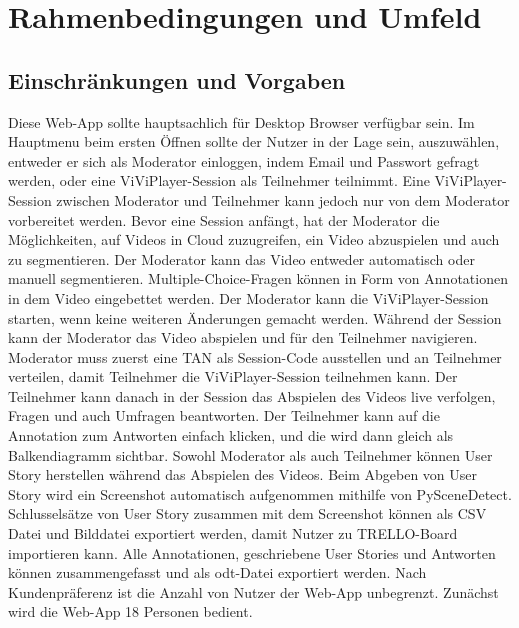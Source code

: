\section{Rahmenbedingungen und Umfeld}

\subsection{Einschränkungen und Vorgaben}
Diese Web-App sollte hauptsachlich für Desktop Browser verfügbar sein. Im Hauptmenu beim ersten Öffnen sollte der Nutzer in der Lage sein, auszuwählen, entweder er sich als Moderator einloggen, indem Email und Passwort gefragt werden, oder eine ViViPlayer-Session als Teilnehmer teilnimmt. Eine ViViPlayer-Session zwischen Moderator und Teilnehmer kann jedoch nur von dem Moderator vorbereitet werden.\linebreak
\linebreak
Bevor eine Session anfängt, hat der Moderator die Möglichkeiten, auf Videos in Cloud zuzugreifen, ein Video abzuspielen und auch zu segmentieren. Der Moderator kann 
das Video entweder automatisch oder manuell segmentieren. Multiple-Choice-Fragen können in Form von Annotationen in dem Video eingebettet werden. Der Moderator kann die ViViPlayer-Session starten, wenn keine weiteren Änderungen gemacht werden.\linebreak
\linebreak
Während der Session kann der Moderator das Video abspielen und für den Teilnehmer navigieren. Moderator muss zuerst eine TAN als Session-Code ausstellen und an Teilnehmer verteilen, damit Teilnehmer die ViViPlayer-Session teilnehmen kann. Der Teilnehmer kann danach in der Session das Abspielen des Videos live verfolgen, Fragen und auch Umfragen beantworten. Der Teilnehmer kann auf die Annotation zum Antworten einfach klicken, und die wird dann gleich als Balkendiagramm sichtbar. 
Sowohl Moderator als auch Teilnehmer können User Story herstellen während das Abspielen des Videos. Beim Abgeben von User Story wird ein Screenshot automatisch aufgenommen mithilfe von PySceneDetect. Schlusselsätze von User Story zusammen mit dem Screenshot können als CSV Datei und Bilddatei exportiert werden, damit Nutzer zu TRELLO-Board importieren kann. 
Alle Annotationen, geschriebene User Stories und Antworten können zusammengefasst und als odt-Datei exportiert werden.\linebreak
\linebreak
Nach Kundenpräferenz ist die Anzahl von Nutzer der Web-App unbegrenzt. Zunächst wird die Web-App 18 Personen bedient.

